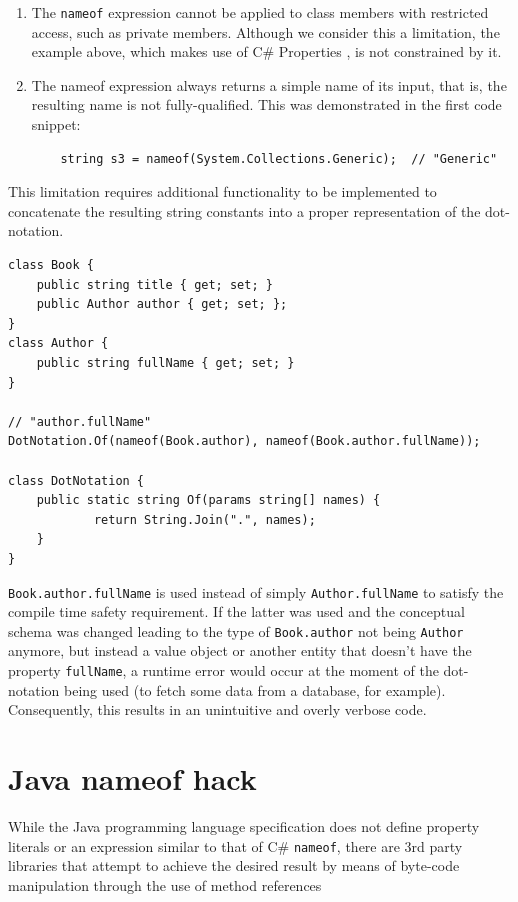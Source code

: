 \begin{enumerate}
    \item The \texttt{nameof} expression cannot be applied to class members with restricted access, such as private members. Although we consider this a limitation, the example above, which makes use of C\# Properties \cite{cSharp-props}, is not constrained by it.

    \item The nameof expression always returns a simple name of its input, that is, the resulting name is not fully-qualified. This was demonstrated in the first code snippet:
\begin{verbatim}
    string s3 = nameof(System.Collections.Generic);  // "Generic"
\end{verbatim}

\end{enumerate}

This limitation requires additional functionality to be implemented to concatenate the resulting string constants into a proper representation of the dot-notation.

\begin{verbatim}
class Book {
    public string title { get; set; }
    public Author author { get; set; };
}
class Author {
    public string fullName { get; set; }
}

// "author.fullName"
DotNotation.Of(nameof(Book.author), nameof(Book.author.fullName));

class DotNotation {
    public static string Of(params string[] names) {
            return String.Join(".", names);
    }
}
\end{verbatim}

\texttt{Book.author.fullName} is used instead of simply \texttt{Author.fullName} to satisfy the compile time safety requirement. If the latter was used and the conceptual schema was changed leading to the type of \texttt{Book.author} not being \texttt{Author} anymore, but instead a value object or another entity that doesn’t have the property \texttt{fullName}, a runtime error would occur at the moment of the dot-notation being used (to fetch some data from a database, for example). Consequently, this results in an unintuitive and overly verbose code.

\section{Java nameof hack}
While the Java programming language specification does not define property literals or an expression similar to that of C\# \texttt{nameof}, there are 3rd party libraries \cite{nameof-strange} \cite{nameof-mobius} that attempt to achieve the desired result by means of byte-code manipulation through the use of method references

